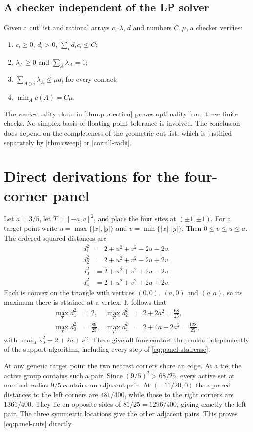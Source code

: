 \subsection{A checker independent of the LP solver}
Given a cut list and rational arrays $c$, $\lambda$, $d$ and numbers $C,\mu$, a checker verifies:
\begin{enumerate}
\item $c_i\ge0$, $d_i>0$, $\sum_i d_i c_i\le C$;
\item $\lambda_A\ge0$ and $\sum_A\lambda_A=1$;
\item $\sum_{A\ni i}\lambda_A\le\mu d_i$ for every contact;
\item $\min_A c(A)=C\mu$.
\end{enumerate}
The weak-duality chain in \cref{thm:protection} proves optimality from these finite checks. No simplex basis or floating-point tolerance is involved. The conclusion does depend on the completeness of the geometric cut list, which is justified separately by \cref{thm:sweep} or \cref{cor:all-radii}.

\section{Direct derivations for the four-corner panel}
\label{app:worked}
Let $a=3/5$, let $T=[-a,a]^2$, and place the four sites at $(\pm1,\pm1)$. For a target point write $u=\max\{|x|,|y|\}$ and $v=\min\{|x|,|y|\}$. Then $0\le v\le u\le a$. The ordered squared distances are
\begin{align*}
d_1^2&=2+u^2+v^2-2u-2v,\\
d_2^2&=2+u^2+v^2-2u+2v,\\
d_3^2&=2+u^2+v^2+2u-2v,\\
d_4^2&=2+u^2+v^2+2u+2v.
\end{align*}
Each is convex on the triangle with vertices $(0,0)$, $(a,0)$ and $(a,a)$, so its maximum there is attained at a vertex. It follows that
\[
\begin{aligned}
\max_T d_1^2&=2,& \max_T d_2^2&=2+2a^2=\tfrac{68}{25},\\
\max_T d_3^2&=\tfrac{89}{25},& \max_T d_4^2&=2+4a+2a^2=\tfrac{128}{25},
\end{aligned}
\]
with $\max_T d_3^2=2+2a+a^2$. These give all four contact thresholds independently of the support algorithm, including every step of \cref{eq:panel-staircase}.

At any generic target point the two nearest corners share an edge. At a tie, the active group contains such a pair. Since $(9/5)^2>68/25$, every active set at nominal radius $9/5$ contains an adjacent pair. At $(-11/20,0)$ the squared distances to the left corners are $481/400$, while those to the right corners are $1361/400$. They lie on opposite sides of $81/25=1296/400$, giving exactly the left pair. The three symmetric locations give the other adjacent pairs. This proves \cref{eq:panel-cuts} directly.

